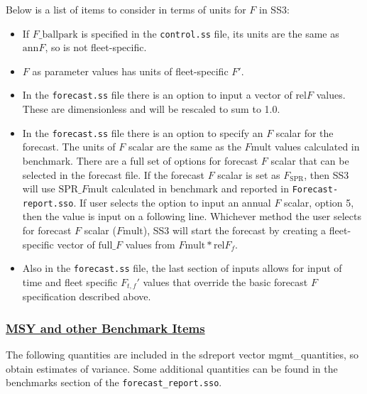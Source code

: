 Below is a list of items to consider in terms of units for $F$ in SS3:
\begin{itemize}
	\item If $F\text{\_ballpark}$ is specified in the \texttt{control.ss} file, its units are the same as $\text{ann}F$, so is not fleet-specific.
	\item $F$ as parameter values has units of fleet-specific $F'$.
	\item In the \texttt{forecast.ss} file there is an option to input a vector of $\text{rel}F$ values. These are dimensionless and will be rescaled to sum to 1.0.
	\item In the \texttt{forecast.ss} file there is an option to specify an $F$ scalar for the forecast. The units of $F$ scalar are the same as the $F\text{mult}$ values calculated in benchmark. There are a full set of options for forecast $F$ scalar that can be selected in the forecast file.
	If the forecast $F$ scalar is set as $F_\text{SPR}$, then SS3 will use $\text{SPR\_}F\text{mult}$ calculated in benchmark and reported in \texttt{Forecast-report.sso}. If user selects the option to input an annual $F$ scalar, option 5, then the value is input on a following line. Whichever method the user selects for forecast $F$ scalar ($F\text{mult}$), SS3 will start the forecast by creating a fleet-specific vector of $\text{full\_}F$ values from $F\text{mult}*\text{rel}F_f$.
	\item Also in the \texttt{forecast.ss} file, the last section of inputs allows for input of time and fleet specific $F_{t,f}'$ values that override the basic forecast $F$ specification described above.
\end{itemize}

\hypertarget{MSYandBenchmarks}{}
\subsubsection[MSY and other Benchmark Items]{\protect\hyperlink{MSYandBenchmarks}{MSY and other Benchmark Items}}
The following quantities are included in the sdreport vector mgmt\_quantities, so obtain estimates of variance. Some additional quantities can be found in the benchmarks section of the \texttt{forecast\_report.sso}.

